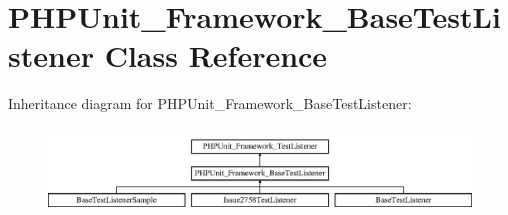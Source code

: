 \hypertarget{class_p_h_p_unit___framework___base_test_listener}{}\section{P\+H\+P\+Unit\+\_\+\+Framework\+\_\+\+Base\+Test\+Listener Class Reference}
\label{class_p_h_p_unit___framework___base_test_listener}
Inheritance diagram for P\+H\+P\+Unit\+\_\+\+Framework\+\_\+\+Base\+Test\+Listener\+:\begin{figure}[H]
\begin{center}
\leavevmode
\includegraphics[height=2.343096cm]{class_p_h_p_unit___framework___base_test_listener}
\end{center}
\end{figure}
